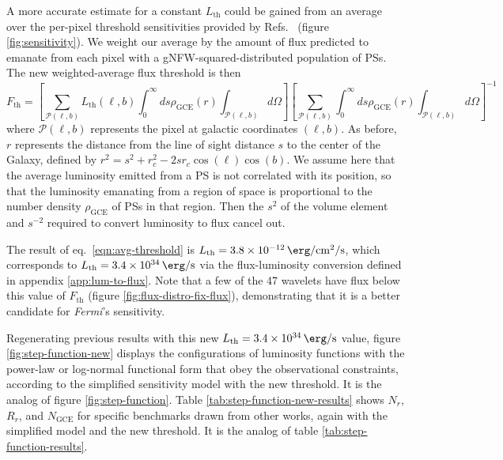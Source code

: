 \documentclass[letter,11pt]{article}
\newcommand{\brackets}[1]{\left[#1\right]}
\begin{document}
A more accurate estimate for a constant $L_\text{th}$ could be gained from an average over the per-pixel threshold sensitivities provided by Refs.~\cite{Fermi-LAT:2019yla, Ballet:2020hze} (figure \ref{fig:sensitivity}). We weight our average by the amount of flux predicted to emanate from each pixel with a gNFW-squared-distributed population of PSs. The new weighted-average flux threshold is then
\begin{equation}
F_\text{th} = \brackets{\sum_{\mathcal{P}(\ell, b)}L_\text{th}(\ell, b) \int_0^\infty ds  \rho_\text{GCE}(r)\int_{\mathcal{P}(\ell, b)} d\Omega}\brackets{\sum_{\mathcal{P}(\ell, b)}\int_0^\infty ds \rho_\text{GCE}(r)\int_{\mathcal{P}(\ell, b)} d\Omega}^{-1}
\label{eqn:avg-threshold}
\end{equation}
where $\mathcal{P}(\ell, b)$ represents the pixel at galactic coordinates $(\ell, b)$.
As before, $r$ represents the distance from the line of sight distance $s$ to the center of the Galaxy, defined by $r^2 = {s^2 + r_c^2 - 2 s r_c \cos(\ell)\cos(b)}$. We assume here that the average luminosity emitted from a PS is not correlated with its position, so that the luminosity emanating from a region of space is proportional to the number density $\rho_\text{GCE}$ of PSs in that region. Then the $s^2$ of the volume element and $s^{-2}$ required to convert luminosity to flux cancel out.

The result of eq.~\ref{eqn:avg-threshold} is $L_\text{th} = \SI{3.8e-12}{\erg\per\cm\squared \per \second}$, which corresponds to $L_\text{th} = \SI{3.4e34}{\erg\per \second}$ via the flux-luminosity conversion defined in appendix \ref{app:lum-to-flux}. Note that a few of the 47 wavelets have flux below this value of $F_\text{th}$ (figure \ref{fig:flux-distro-fix-flux}), demonstrating that it is a better candidate for \textit{Fermi}'s sensitivity.

Regenerating previous results with this new $L_\text{th} = \SI{3.4e34}{\erg\per\second}$ value, figure \ref{fig:step-function-new} displays the configurations of luminosity functions with the power-law or log-normal functional form that obey the observational constraints, according to the simplified sensitivity model with the new threshold. It is the analog of figure \ref{fig:step-function}. Table \ref{tab:step-function-new-results} shows $N_r$, $R_r$, and $N_\text{GCE}$ for specific benchmarks drawn from other works, again with the simplified model and the new threshold. It is the analog of table \ref{tab:step-function-results}.
\end{document}
